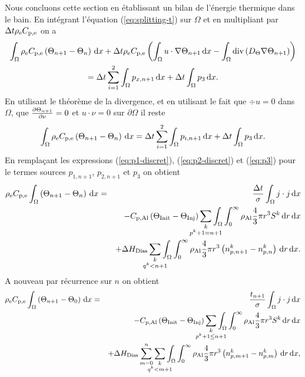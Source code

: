 Nous concluons cette section en établissant un bilan de l'énergie
thermique dans le bain. En intégrant l'équation (\ref{eq:splitting-t})
sur $\Omega$ et en multipliant par $\Delta t\rho_\mathrm{e}C_{\mathrm{p,e}}$
on a
\begin{multline}
\int_\Omega\rho_\mathrm{e}C_{\mathrm{p,e}}\left( \Theta_{n+1}
- \Theta_n \right)\,\mathrm dx
+\Delta t\rho_\mathrm{e}C_{\mathrm{p,e}}\left( \int_\Omega
  u\cdot\nabla\Theta_{n+1}\,\mathrm dx - \int_\Omega
  \mathrm{div}\left( D_\Theta\nabla\Theta_{n+1} \right) \right) \\
= \Delta t\sum_{i=1}^2\int_\Omega p_{x,n+1}\,\mathrm dx + \Delta t\int_\Omega p_3\,\mathrm dx.
\end{multline}
En utilisant le théorème de la divergence, et en utilisant le fait que
$\div u = 0$ dans $\Omega$, que $\frac{\partial
  \Theta_{n+1}}{\partial \nu} = 0$ et $u\cdot \nu = 0$ sur
$\partial \Omega$ il reste
\begin{equation}
  \int_\Omega\rho_\mathrm{e}C_{\mathrm{p,e}}\left( \Theta_{n+1} - \Theta_n \right)\,\mathrm dx = \Delta t\sum_{i=1}^2\int_\Omega p_{i,n+1}\,\mathrm dx + \Delta t\int_\Omega p_3\,\mathrm dx.
\end{equation}
En remplaçant les expressions (\ref{eq:p1-discret}), (\ref{eq:p2-discret}) et (\ref{eq:p3}) pour le termes sources $p_{1,n+1}$, $p_{2,n+1}$ et $p_3$ on obtient
\begin{eqnarray*}
  \electrolytedensity\electrolytehc\int_\Omega\parent{\temperature_{n+1} - \temperature_n}\intd{x} &=& \frac{\dt}{ \conductivity}\int_\Omega j\cdot j\intd{x}\\
  && - \aluminahc\parent{\tinit - \tinj}\sum_{\mathclap{\substack{k\\ p^k + 1 = n+1}}}\int_\Omega\int_0^\infty \aluminadensity \frac{4}{3}\pi r^3 S^k\intd{r}\intd{x}\\
  && + {\aluminadissolutionenthalpy}\sum_{\mathclap{\substack{k\\ q^k < n+1}}} \int_\Omega\int_0^\infty \aluminadensity \frac{4}{3}\pi r^3\parent{n_{p,n+1}^k-n_{p,n}^k}\intd{r}\intd{x}.
\end{eqnarray*}
A nouveau par récurrence sur $n$ on obtient
\begin{eqnarray}
  \electrolytedensity\electrolytehc\int_\Omega\parent{\temperature_{n+1} - \temperature_0}\intd{x} &=& \frac{t_{n+1}}{\conductivity}\int_\Omega j\cdot j\intd{x}\nonumber\\
  && - \aluminahc\parent{\tinit - \tinj}\sum_{\mathclap{\substack{k\\ p^k + 1 \leq n+1}}}\int_\Omega\int_0^\infty \aluminadensity \frac{4}{3}\pi r^3 S^k\intd{r}\intd{x}\nonumber\\
  && + {\aluminadissolutionenthalpy}\sum_{m =
    0}^{n}\sum_{\mathclap{\substack{k\\ q^k < m + 1}}}
  \int_\Omega\int_0^\infty \aluminadensity \frac{4}{3}\pi
  r^3\parent{n_{p,m+1}^k-n_{p,m}^k}\intd{r}\intd{x},\nonumber\\ \label{eq:energy-mass-balance}
\end{eqnarray}
